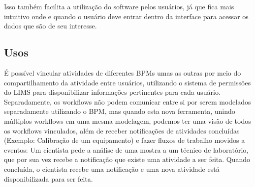 Isso também facilita a utilização do software pelos usuários, já que fica mais intuitivo onde e quando o usuário deve entrar dentro da interface para acessar os dados que são de seu interesse.


\subsection{Usos}

É possível vincular atividades de diferentes BPMs umas as outras por meio do compartilhamento da atividade entre usuários, utilizando o sistema de permissões do LIMS para disponibilizar informações pertinentes para cada usuário. Separadamente, os workflows não podem comunicar entre si por serem modelados separadamente utilizando o BPM, mas quando esta nova ferramenta, unindo múltiplos workflows em uma mesma modelagem, podemos ter uma visão de todos os workflows vinculados, além de receber notificações de atividades concluídas (Exemplo: Calibração de um equipamento) e fazer fluxos de trabalho movidos a eventos: Um cientista pede a análise de uma mostra a um técnico de laboratório, que por sua vez recebe a notificação que existe uma atividade a ser feita. Quando concluída, o cientista recebe uma notificação e uma nova atividade está disponibilizada para ser feita.